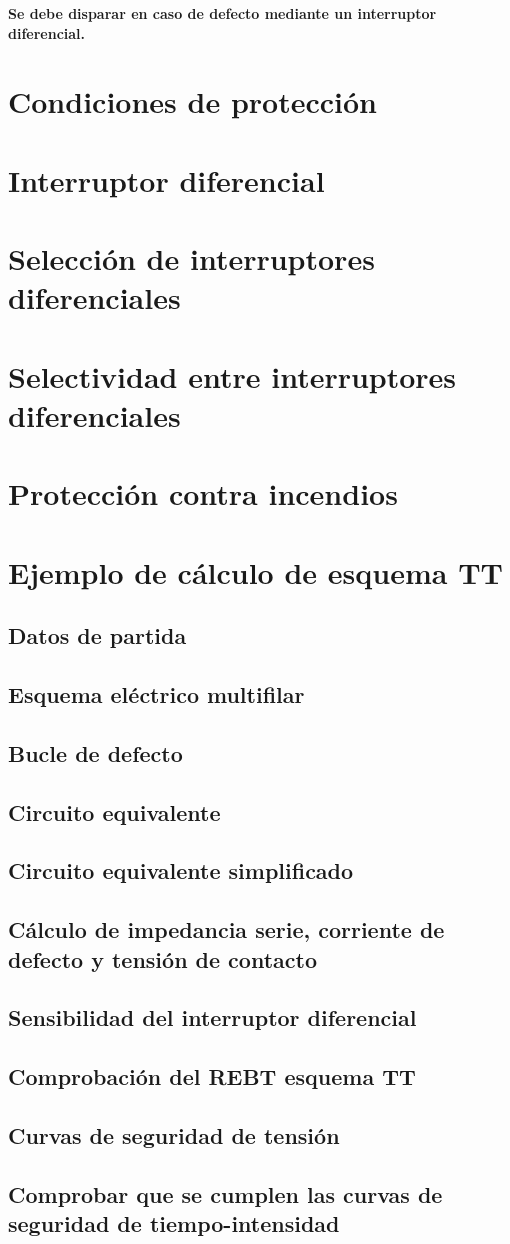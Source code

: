 \textbf{Se debe disparar en caso de defecto mediante un interruptor diferencial.}
\section{Condiciones de protección}
\section{Interruptor diferencial}
\section{Selección de interruptores diferenciales}
\section{Selectividad entre interruptores diferenciales}
\section{Protección contra incendios}
\section{Ejemplo de cálculo de esquema TT}
\subsection{Datos de partida}
\subsection{Esquema eléctrico multifilar}
\subsection{Bucle de defecto}
\subsection{Circuito equivalente}
\subsection{Circuito equivalente simplificado}
\subsection{Cálculo de impedancia serie, corriente de defecto y tensión de contacto}
\subsection{Sensibilidad del interruptor diferencial}
\subsection{Comprobación del REBT esquema TT}
\subsection{Curvas de seguridad de tensión}
\subsection{Comprobar que se cumplen las curvas de seguridad de tiempo-intensidad}
